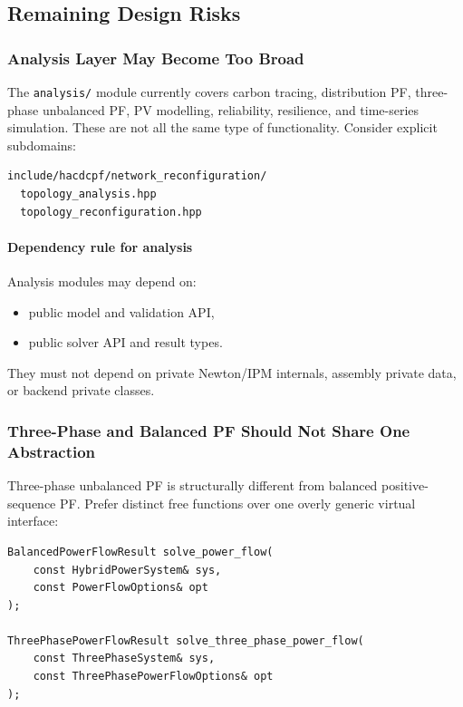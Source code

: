 \subsection{Remaining Design Risks}
\label{sec:design-risks}

\subsubsection{Analysis Layer May Become Too Broad}

The \texttt{analysis/} module currently covers carbon tracing, distribution
PF, three-phase unbalanced PF, PV modelling, reliability, resilience, and
time-series simulation.  These are not all the same type of functionality.
Consider explicit subdomains:

\begin{verbatim}
include/hacdcpf/network_reconfiguration/
  topology_analysis.hpp
  topology_reconfiguration.hpp
\end{verbatim}

\paragraph{Dependency rule for analysis}
Analysis modules may depend on:
\begin{itemize}
  \item public model and validation API,
  \item public solver API and result types.
\end{itemize}
They must not depend on private Newton/IPM internals, assembly private data,
or backend private classes.

\subsubsection{Three-Phase and Balanced PF Should Not Share One Abstraction}

Three-phase unbalanced PF is structurally different from balanced
positive-sequence PF.  Prefer distinct free functions over one overly
generic virtual interface:

\begin{verbatim}
BalancedPowerFlowResult solve_power_flow(
    const HybridPowerSystem& sys,
    const PowerFlowOptions& opt
);

ThreePhasePowerFlowResult solve_three_phase_power_flow(
    const ThreePhaseSystem& sys,
    const ThreePhasePowerFlowOptions& opt
);
\end{verbatim}

